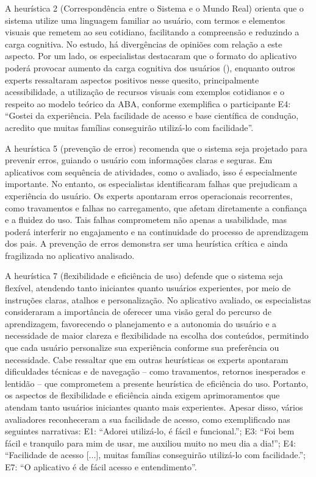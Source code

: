 \documentclass[portuguese]{textolivre}
\begin{document}
A heurística 2 (Correspondência entre o Sistema e o Mundo Real) orienta que o sistema utilize uma linguagem familiar ao usuário, com termos e elementos visuais que remetem ao seu cotidiano, facilitando a compreensão e reduzindo a carga cognitiva. No estudo, há divergências de opiniões com relação a este aspecto. Por um lado, os especialistas destacaram que o formato do aplicativo poderá provocar aumento da carga cognitiva dos usuários (), enquanto outros experts ressaltaram aspectos positivos nesse quesito, principalmente acessibilidade, a utilização de recursos visuais com exemplos cotidianos e o respeito ao modelo teórico da ABA, conforme exemplifica o participante E4: “Gostei da experiência. Pela facilidade de acesso e base científica de condução, acredito que muitas famílias conseguirão utilizá-lo com facilidade”.

A heurística 5 (prevenção de erros) recomenda que o sistema seja projetado para prevenir erros, guiando o usuário com informações claras e seguras. Em aplicativos com sequência de atividades, como o avaliado, isso é especialmente importante. No entanto, os especialistas identificaram falhas que prejudicam a experiência do usuário. Os experts apontaram erros operacionais recorrentes, como travamentos e falhas no carregamento, que afetam diretamente a confiança e a fluidez do uso. Tais falhas comprometem não apenas a usabilidade, mas poderá interferir no engajamento e na continuidade do processo de aprendizagem dos pais. A prevenção de erros demonstra ser uma heurística crítica e ainda fragilizada no aplicativo analisado.

A heurística 7 (flexibilidade e eficiência de uso) defende que o sistema seja flexível, atendendo tanto iniciantes quanto usuários experientes, por meio de instruções claras, atalhos e personalização. No aplicativo avaliado, os especialistas consideraram a importância de oferecer uma visão geral do percurso de aprendizagem, favorecendo o planejamento e a autonomia do usuário e a necessidade de maior clareza e flexibilidade na escolha dos conteúdos, permitindo que cada usuário personalize sua experiência conforme sua preferência ou necessidade. Cabe ressaltar que em outras heurísticas os experts apontaram dificuldades técnicas e de navegação – como travamentos, retornos inesperados e lentidão – que comprometem a presente heurística de eficiência do uso. Portanto, os aspectos de flexibilidade e eficiência ainda exigem aprimoramentos que atendam tanto usuários iniciantes quanto mais experientes. Apesar disso, vários avaliadores reconheceram a sua facilidade de acesso, como exemplificado nas seguintes narrativas: E1: “Adorei utilizá-lo, é fácil e funcional.”; E3: “Foi bem fácil e tranquilo para mim de usar, me auxiliou muito no meu dia a dia!”; E4: “Facilidade de acesso [...], muitas famílias conseguirão utilizá-lo com facilidade.”; E7: “O aplicativo é de fácil acesso e entendimento”.
\end{document}
